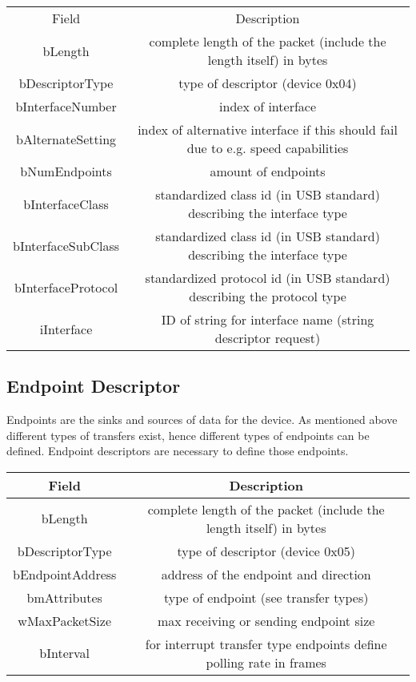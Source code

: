 \begin{tabular}{c|c}
Field & Description \\
bLength &  complete length of the packet (include the length itself) in bytes \\
bDescriptorType &  type of descriptor (device 0x04) \\
bInterfaceNumber & index of interface \\
bAlternateSetting & index of alternative interface if this should fail due to e.g. speed capabilities \\
bNumEndpoints & amount of endpoints \\
bInterfaceClass & standardized class id (in USB standard) describing the interface type \\
bInterfaceSubClass & standardized class id (in USB standard) describing the interface type \\
bInterfaceProtocol & standardized protocol id (in USB standard) describing the protocol type \\
iInterface & ID of string for interface name (string descriptor request) \\
\end{tabular}

\subsection{Endpoint Descriptor} 
Endpoints are the sinks and sources of data for the device. As mentioned above different types of transfers exist, hence different types of 
endpoints can be defined. Endpoint descriptors are necessary to define those endpoints.

\begin{tabular}{c|c}
Field & Description \\ \hline
bLength & complete length of the packet (include the length itself) in bytes \\
bDescriptorType & type of descriptor (device 0x05) \\
bEndpointAddress & address of the endpoint and direction\\
bmAttributes & type of endpoint (see transfer types)\\
wMaxPacketSize & max receiving or sending endpoint size\\
bInterval & for interrupt transfer type endpoints define polling rate in frames\\
\end{tabular}
